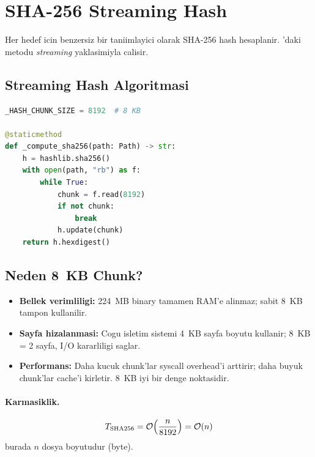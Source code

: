 \section{SHA-256 Streaming Hash}
\label{sec:sha256-hash}

Her hedef icin benzersiz bir taniimlayici olarak SHA-256 hash hesaplanir. 'daki  metodu \emph{streaming} yaklasimiyla calisir.

\subsection{Streaming Hash Algoritmasi}

\begin{lstlisting}[language=Python, caption={8~KB chunk'larla SHA-256 hesaplama}]
_HASH_CHUNK_SIZE = 8192  # 8 KB

@staticmethod
def _compute_sha256(path: Path) -> str:
    h = hashlib.sha256()
    with open(path, "rb") as f:
        while True:
            chunk = f.read(8192)
            if not chunk:
                break
            h.update(chunk)
    return h.hexdigest()
\end{lstlisting}

\subsection{Neden 8~KB Chunk?}

\begin{itemize}
\item \textbf{Bellek verimliligi:} 224~MB binary tamamen RAM'e alinmaz; sabit 8~KB tampon kullanilir.
\item \textbf{Sayfa hizalanmasi:} Cogu isletim sistemi 4~KB sayfa boyutu kullanir; 8~KB = 2 sayfa, I/O kararliligi saglar.
\item \textbf{Performans:} Daha kucuk chunk'lar syscall overhead'i arttirir; daha buyuk chunk'lar cache'i kirletir. 8~KB iyi bir denge noktasidir.
\end{itemize}

\paragraph{Karmasiklik.}
\begin{equation}
\label{eq:sha256-complexity}
T_{\text{SHA256}} = \mathcal{O}\!\left(\frac{n}{8192}\right) = \mathcal{O}\!\left(n\right)
\end{equation}
burada $n$ dosya boyutudur (byte).

